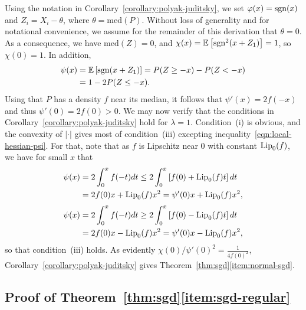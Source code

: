 Using the notation in Corollary~\ref{corollary:polyak-juditsky}, we set
$\varphi(x) = \mathrm{sgn}(x)$ and $Z_i = X_i - \theta$, where $\theta =
\mbox{med}(P)$. Without loss of generality and for notational convenience,
we assume for the remainder of this derivation that $\theta = 0$.
As a consequence, we have $\mbox{med}(Z) = 0$,
and $\chi(x) = \mathbb{E}\left[  \mathrm{sgn}^2(x+Z_1) \right]= 1$, so
$\chi(0) = 1$. In addition,
\begin{align*}
  \psi(x) & = \mathbb{E}\left[  \mathrm{sgn}(x+ Z_1) \right] = 
  P(Z \ge -x) - P(Z < -x) \\
  & = 1 - 2 P(Z \le -x).
\end{align*}
Using that $P$ has a density $f$ near its median, it follows that $\psi'(x)
= 2f(-x)$ and thus $\psi'(0) = 2f(0) > 0$.  We may now verify that the
conditions in Corollary~\ref{corollary:polyak-juditsky} hold for $\lambda =
1$. Condition~(i) is obvious, and the convexity of $|\cdot|$ gives most of
condition~(iii) excepting inequality~\eqref{eqn:local-hessian-psi}. For
that, note that as $f$ is Lipschitz near $0$ with constant ${\rm \textup{Lip}}_0(f)$, we 
have for small $x$ that
\begin{align*}
  \psi(x) & = 2 \int_0^x f(-t) dt
  \leq 2 \int_0^x \left[f(0) + {\rm \textup{Lip}}_0(f) t \right] dt \\
  & = 2 f(0) x + {\rm \textup{Lip}}_0(f) x^2 = \psi'(0) x + {\rm \textup{Lip}}_0(f) x^2,
\end{align*}
\begin{align*}
  \psi(x) & = 2 \int_0^x f(-t) dt
  \geq 2 \int_0^x \left[f(0) - {\rm \textup{Lip}}_0(f) t \right] dt
  \\
  & = 2 f(0) x - {\rm \textup{Lip}}_0(f) x^2 = \psi'(0) x - {\rm \textup{Lip}}_0(f) x^2,
\end{align*}
so that condition~(iii) holds.
As evidently $\chi(0) / \psi'(0)^2 = \frac{1}{4 f(0)^2}$,
Corollary~\ref{corollary:polyak-juditsky} gives
Theorem~\ref{thm:sgd}\eqref{item:normal-sgd}.

\subsection{Proof of Theorem~\ref{thm:sgd}\eqref{item:sgd-regular}}
\label{sec:proof-sgd-regular}

